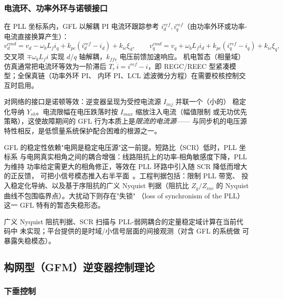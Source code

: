 \subsubsection{电流环、功率外环与诺顿接口}

在 PLL 坐标系内，GFL 以解耦 PI 电流环跟踪参考
$i_d^{ref},i_q^{ref}$（由功率外环或功率-电流直接换算产生）：
\begin{equation}
v_d^{cmd}=v_d-\omega_b L_f i_q+k_{pc}(i_d^{ref}-i_d)+k_{ic}\xi_d,\qquad
v_q^{cmd}=v_q+\omega_b L_f i_d+k_{pc}(i_q^{ref}-i_q)+k_{ic}\xi_q,
\label{sec:dy-th-ctl-eq-curr}
\end{equation}
交叉项 $\mp\omega_b L_f i$ 实现 $d$/$q$ 轴解耦，$k_{ffv}$ 电压前馈加速响应。
机电暂态（相量域）仿真通常把电流环等效为一阶滞后
$T_r\,\dot i=i^{ref}-i$，即 REGC/REEC 型紧凑模型；全保真链（功率外环 PI、
内环 PI、LCL 滤波微分方程）在需要校核控制交互时启用。

对网络的接口是诺顿等效：逆变器呈现为受控电流源 $I_{inj}$ 并联一个（小的）
稳定化导纳 $Y_{sh}$。电流限幅在电压跌落时按 $I_{max}$ 缩放注入电流（幅值限制
或无功优先策略），这使故障期间的 GFL 行为本质上是\emph{限流的电流源}——
与同步机的电压源特性相反，是低惯量系统保护配合困难的根源之一。

\begin{remark}[弱网稳定性与序贯问题]
GFL 的稳定性依赖"电网是稳定电压源"这一前提。短路比（SCR）低时，PLL 坐标系
与电网真实相角之间的耦合增强：线路阻抗上的功率-相角敏感度下降，PLL 为维持
功率给定需更大的相角修正，等效在 PLL 环路中引入随 SCR 降低而增大的正反馈，
可把小信号模态推入右半平面~\cite{ctl:zhou-pll}。工程判据包括：限制 PLL 带宽、
投入稳定化导纳、以及基于序阻抗的广义 Nyquist 判据（阻抗比
$Z_g/Z_{inv}$ 的 Nyquist 曲线不包围临界点）。大扰动下则存在"失锁"
（loss of synchronism of the PLL）这一 GFL 特有的暂态失稳形态。
\end{remark}

\begin{gapnote}
广义 Nyquist 阻抗判据、SCR 扫描与 PLL-弱网耦合的定量稳定域计算在当前代码中
未实现；平台提供的是时域/小信号层面的间接观测（对含 GFL 的系统做
 可暴露失稳模态）。
\end{gapnote}

\subsection{构网型（GFM）逆变器控制理论}\label{sec:dy-th-ctl-gfm}

\subsubsection{下垂控制}

